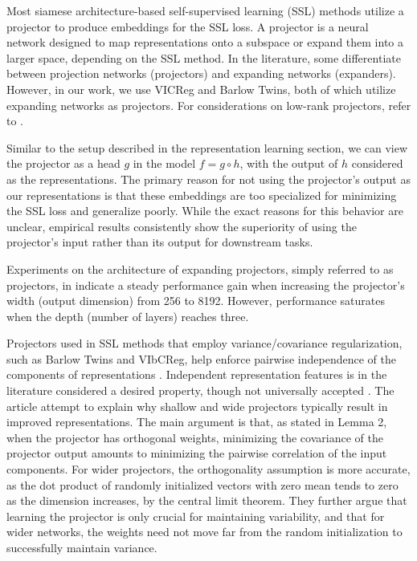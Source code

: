 \documentclass[../../thesis.tex]{subfiles}
\begin{document}
Most siamese architecture-based self-supervised learning (SSL) methods utilize a projector to produce embeddings for the SSL loss. A projector is a neural network designed to map representations onto a subspace or expand them into a larger space, depending on the SSL method. In the literature, some differentiate between projection networks (projectors) and expanding networks (expanders). However, in our work, we use VICReg and Barlow Twins, both of which utilize expanding networks as projectors. For considerations on low-rank projectors, refer to \cite{gupta2022understanding}.\newline

Similar to the setup described in the representation learning section, we can view the projector as a head $g$ in the model $f = g\circ h$, with the output of $h$ considered as the representations. The primary reason for not using the projector's output as our representations is that these embeddings are too specialized for minimizing the SSL loss and generalize poorly. While the exact reasons for this behavior are unclear, empirical results consistently show the superiority of using the projector's input rather than its output for downstream tasks.\newline

Experiments on the architecture of expanding projectors, simply referred to as projectors, in \cite{zbontar2021barlow,bardes2022vicreg} indicate a steady performance gain when increasing the projector's width (output dimension) from 256 to 8192. However, performance saturates when the depth (number of layers) reaches three.\newline

Projectors used in SSL methods that employ variance/covariance regularization, such as Barlow Twins and VIbCReg, help enforce pairwise independence of the components of representations \cite{mialon2024variance}. Independent representation features is in the literature considered a desired property, though not universally accepted \cite{träuble2021disentangled,Rep-rev-persp}. The article \cite{mialon2024variance} attempt to explain why shallow and wide projectors typically result in improved representations. The main argument is that, as stated in Lemma 2, when the projector has orthogonal weights, minimizing the covariance of the projector output amounts to minimizing the pairwise correlation of the input components. For wider projectors, the orthogonality assumption is more accurate, as the dot product of randomly initialized vectors with zero mean tends to zero as the dimension increases, by the central limit theorem. They further argue that learning the projector is only crucial for maintaining variability, and that for wider networks, the weights need not move far from the random initialization to successfully maintain variance.   
\end{document}
